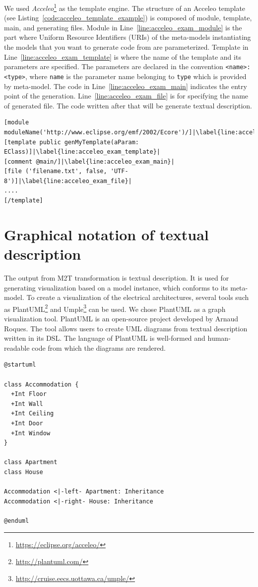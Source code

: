 We used \textit{Acceleo}\footnote{\url{https://eclipse.org/acceleo/}} as the template engine. The structure of an Acceleo template (see Listing~\ref{code:acceleo_template_example}) is composed of module, template, main, and generating files. Module in Line~\ref{line:acceleo_exam_module} is the part where Uniform Resource Identifiers (URIs) of the meta-models instantiating the models that you want to generate code from are parameterized. Template in Line~\ref{line:acceleo_exam_template} is where the name of the template and its parameters are specified. The parameters are declared in the convention \texttt{<name>:<type>}, where \texttt{name} is the parameter name belonging to \texttt{type} which is provided by meta-model. The code in Line~\ref{line:acceleo_exam_main} indicates the entry point of the generation. Line~\ref{line:acceleo_exam_file} is for specifying the name of generated file. The code written after that will be generate textual description. 

\begin{lstlisting}[escapechar=|,caption=An example of Acceleo template, label=code:acceleo_template_example]
[module moduleName('http://www.eclipse.org/emf/2002/Ecore')/]|\label{line:acceleo_exam_module}|
[template public genMyTemplate(aParam: EClass)]|\label{line:acceleo_exam_template}|
[comment @main/]|\label{line:acceleo_exam_main}|
[file ('filename.txt', false, 'UTF-8')]|\label{line:acceleo_exam_file}|
....
[/template]
\end{lstlisting}


\section{Graphical notation of textual description}
The output from M2T transformation is textual description. It is used for generating visualization based on a model instance, which conforms to its meta-model. To create a visualization of the electrical architectures, several tools such as PlantUML\footnote{\url{http://plantuml.com/}} and Umple\footnote{\url{http://cruise.eecs.uottawa.ca/umple/}} can be used. We chose PlantUML as a graph visualization tool. PlantUML is an open-source project developed by Arnaud Roques. The tool allows users to create UML diagrams from textual description written in its DSL. The language of PlantUML is well-formed and human-readable code from which the diagrams are rendered.

\begin{lstlisting}[caption=An example of textual description of a class diagram, label=code:plantuml_class]
@startuml

class Accommodation {
  +Int Floor
  +Int Wall
  +Int Ceiling
  +Int Door
  +Int Window
}

class Apartment
class House

Accommodation <|-left- Apartment: Inheritance
Accommodation <|-right- House: Inheritance

@enduml
\end{lstlisting}

